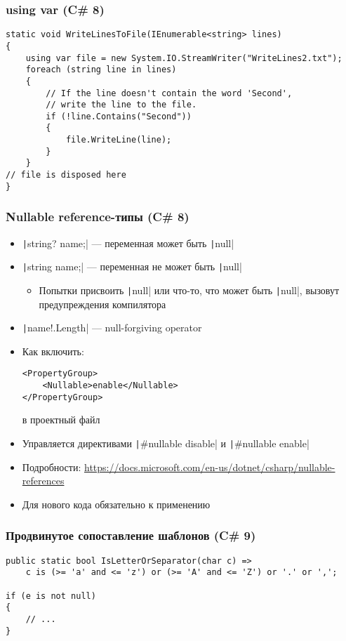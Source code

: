 \documentclass[xetex,mathserif,serif]{beamer}
\begin{document}
    \begin{frame}[fragile]
        \frametitle{using var (C\# 8)}
        \begin{verbatim}
static void WriteLinesToFile(IEnumerable<string> lines)
{
    using var file = new System.IO.StreamWriter("WriteLines2.txt");
    foreach (string line in lines)
    {
        // If the line doesn't contain the word 'Second', 
        // write the line to the file.
        if (!line.Contains("Second"))
        {
            file.WriteLine(line);
        }
    }
// file is disposed here
}
        \end{verbatim}
    \end{frame}

    \begin{frame}[fragile]
        \frametitle{Nullable reference-типы (C\# 8)}
        \begin{itemize}
            \item \texttt|string? name;| --- переменная может быть \texttt|null|
            \item \texttt|string name;| --- переменная не может быть \texttt|null|
            \begin{itemize}
                \item Попытки присвоить \texttt|null| или что-то, что может быть \texttt|null|, вызовут предупреждения компилятора
            \end{itemize}
            \item \texttt|name!.Length| --- null-forgiving operator
            \item Как включить: 
                \begin{verbatim}
<PropertyGroup>
    <Nullable>enable</Nullable>
</PropertyGroup>
                \end{verbatim}
                в проектный файл
            \item Управляется директивами \texttt|#nullable disable| и \texttt|#nullable enable|
            \item Подробности: \url{https://docs.microsoft.com/en-us/dotnet/csharp/nullable-references}
            \item Для нового кода обязательно к применению
        \end{itemize}
    \end{frame}

    \begin{frame}[fragile]
        \frametitle{Продвинутое сопоставление шаблонов (C\# 9)}
        \begin{verbatim}
public static bool IsLetterOrSeparator(char c) =>
    c is (>= 'a' and <= 'z') or (>= 'A' and <= 'Z') or '.' or ',';

if (e is not null)
{
    // ...
}
        \end{verbatim}
    \end{frame}
\end{document}
